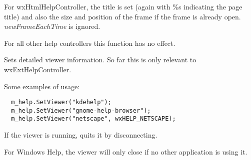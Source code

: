 For wxHtmlHelpController, the title is set (again with \%s indicating the
page title) and also the size and position of the frame if the frame is already
open. {\it newFrameEachTime} is ignored.

For all other help controllers this function has no effect.

\label{wxhelpcontrollersetviewer}


Sets detailed viewer information. So far this is only relevant to wxExtHelpController.

Some examples of usage:

\begin{verbatim}
  m_help.SetViewer("kdehelp");
  m_help.SetViewer("gnome-help-browser");
  m_help.SetViewer("netscape", wxHELP_NETSCAPE);
\end{verbatim}

\label{wxhelpcontrollerquit}


If the viewer is running, quits it by disconnecting.

For Windows Help, the viewer will only close if no other application is using it.

